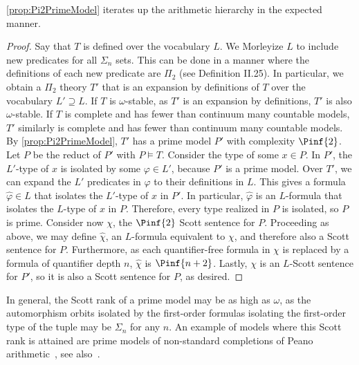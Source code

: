 \documentclass[10pt,a4paper]{amsart}
\renewcommand{\-}{\text{-}}
\begin{document}
\cref{prop:Pi2PrimeModel} iterates up the arithmetic hierarchy in the expected manner.

\pinprime

\begin{proof}
Say that $T$ is defined over the vocabulary $L$.
We Morleyize $L$ to include new predicates for all $\Sigma_n$ sets.
This can be done in a manner where the definitions of each new predicate are $\Pi_2$ (see \cite{Part2} Definition II.25).
In particular, we obtain a $\Pi_2$ theory $T'$ that is an expansion by definitions of $T$ over the vocabulary $L'\supseteq L$.
If $T$ is $\omega$-stable, as $T'$ is an expansion by definitions, $T'$ is also $\omega$-stable.
If $T$ is complete and has fewer than continuum many countable models, $T'$ similarly is complete and has fewer than continuum many countable models.
By \cref{prop:Pi2PrimeModel}, $T'$ has a prime model $P'$ with complexity $\Pinf{2}$.
Let $P$ be the reduct of $P'$ with $P\models T$.
Consider the type of some $x\in P$.
In $P'$, the $L'$-type of $x$ is isolated by some $\varphi\in L'$, because $P'$ is a prime model.
Over $T'$, we can expand the $L'$ predicates in $\varphi$ to their definitions in $L$.
This gives a formula $\hat{\varphi}\in L$ that isolates the $L'$-type of $x$ in $P'$.
In particular, $\hat{\varphi}$ is an $L$-formula that isolates the $L$-type of $x$ in $P$.
Therefore, every type realized in $P$ is isolated, so $P$ is prime.
Consider now $\chi$, the $\Pinf{2}$ Scott sentence for $P$.
Proceeding as above, we may define $\hat{\chi}$, an $L$-formula equivalent to $\chi$, and therefore also a Scott sentence for $P$.
Furthermore, as each quantifier-free formula in $\chi$ is replaced by a formula of quantifier depth $n$, $\hat{\chi}$ is  $\Pinf{n+2}$.
Lastly, $\chi$ is an $L$-Scott sentence for $P'$, so it is also a Scott sentence for $P$, as desired.
\end{proof}

In general, the Scott rank of a prime model may be as high as $\omega$, as the automorphism orbits isolated by the first-order formulas isolating the first-order type of the tuple may be $\Sigma_n$ for any $n$. An example of models where this Scott rank is attained are prime models of non-standard completions of Peano arithmetic~\cite{montalban2024}, see also~\cite{GLRS}.
\end{document}
